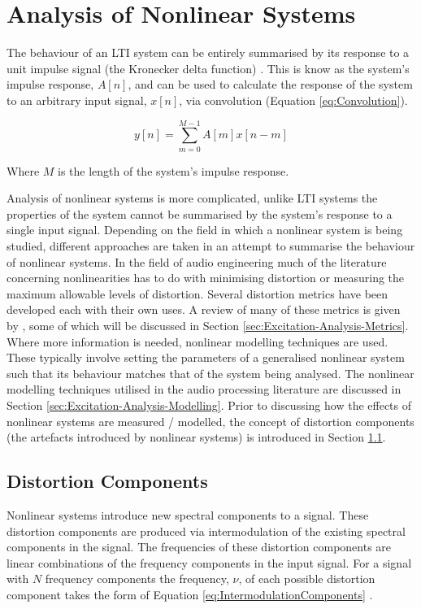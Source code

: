 \section{Analysis of Nonlinear Systems}
\label{sec:Excitation-AnalysisOfNonlinearSystems}
	The behaviour of an LTI system can be entirely summarised by its response to a unit impulse signal (the Kronecker
	delta function) \citep{phillips2007signals}. This is know as the system's impulse response, $A[n]$, and can be used
	to calculate the response of the system to an arbitrary input signal, $x[n]$, via convolution (Equation
	\ref{eq:Convolution}).

	\begin{equation}
		y[n] = \sum_{m = 0}^{M - 1} A[m]x[n-m]
		\label{eq:Convolution}
	\end{equation}

	Where $M$ is the length of the system's impulse response.
	
	Analysis of nonlinear systems is more complicated, unlike LTI systems the properties of the system cannot be
	summarised by the system's response to a single input signal. Depending on the field in which a nonlinear system is
	being studied, different approaches are taken in an attempt to summarise the behaviour of nonlinear systems. In the
	field of audio engineering much of the literature concerning nonlinearities has to do with minimising distortion or
	measuring the maximum allowable levels of distortion. Several distortion metrics have been developed each with their
	own uses. A review of many of these metrics is given by \citet{voishvillo2006assessment}, some of which will be
	discussed in Section \ref{sec:Excitation-Analysis-Metrics}.  Where more information is needed, nonlinear modelling
	techniques are used.  These typically involve setting the parameters of a generalised nonlinear system such that its
	behaviour matches that of the system being analysed. The nonlinear modelling techniques utilised in the audio
	processing literature are discussed in Section \ref{sec:Excitation-Analysis-Modelling}. Prior to discussing how the
	effects of nonlinear systems are measured / modelled, the concept of distortion components (the artefacts introduced
	by nonlinear systems) is introduced in Section \ref{sec:Excitation-Analysis-Components}.

	\subsection{Distortion Components}
	\label{sec:Excitation-Analysis-Components}
		Nonlinear systems introduce new spectral components to a signal. These distortion components are produced
		via intermodulation of the existing spectral components in the signal. The frequencies of these distortion
		components are linear combinations of the frequency components in the input signal. For a signal with $N$
		frequency components the frequency, $\nu$, of each possible distortion component takes the form of Equation
		\ref{eq:IntermodulationComponents} \citep{hulick2005solid}.

